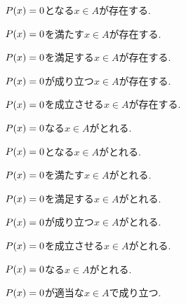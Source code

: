 \item $P(x)=0$となる$x\in A$が存在する.
\item $P(x)=0$を満たす$x\in A$が存在する.
\item $P(x)=0$を満足する$x\in A$が存在する.
\item $P(x)=0$が成り立つ$x\in A$が存在する.
\item $P(x)=0$を成立させる$x\in A$が存在する.
\item $P(x)=0$なる$x\in A$がとれる.
\item $P(x)=0$となる$x\in A$がとれる.
\item $P(x)=0$を満たす$x\in A$がとれる.
\item $P(x)=0$を満足する$x\in A$がとれる.
\item $P(x)=0$が成り立つ$x\in A$がとれる.
\item $P(x)=0$を成立させる$x\in A$がとれる.
\item $P(x)=0$なる$x\in A$がとれる.
\item $P(x)=0$が適当な$x\in A$で成り立つ.
